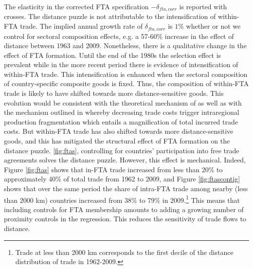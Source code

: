 \documentclass[12pt,twoside,a4paper,notitlepage]{article}
\begin{document}
The elasticity in the corrected FTA specification $-\delta_{fta,corr}$ is reported with crosses.
The distance puzzle is not attributable to the intensification of within-FTA trade.
The implied annual growth rate of $\delta_{fta,corr}$ is $1$\% whether or not we control for sectoral composition effects, e.g.
a 57-60\% increase in the effect of distance between 1963 and 2009.
Nonetheless, there is a qualitative change in the effect of FTA formation.
Until the end of the 1980s the selection effect is prevalent while in the more recent period there is evidence of intensification of within-FTA trade.
This intensification is enhanced when the sectoral composition of country-specific composite goods is fixed.
Thus, the composition of within-FTA trade is likely to have shifted towards more distance-sensitive goods.
This evolution would be consistent with the theoretical mechanism of \cite{Duranton2008} as well as with the mechanism outlined in \cite{Yi2010} whereby decreasing trade costs trigger intraregional production fragmentation which entails a magnification of total incurred trade costs.
But within-FTA trade has also shifted towards more distance-sensitive goods, and this has mitigated the structural effect of FTA formation on the distance puzzle.
\ref{fig:ftas}, controlling for countries' participation into free trade agreements solves the distance puzzle.
However, this effect is mechanical.
Indeed, Figure 
\ref{fig:ftas} shows that in-FTA trade increased from less than 20\% to approximately 40\% of total trade from 1962 to 2009, and Figure 
\ref{fig:ftascontig} shows that over the same period the share of intra-FTA trade among nearby (less than 2000 km) countries increased from 38\% to 79\% in 2009.\footnote{Trade at less than 2000 km corresponds to the first decile of the distance distribution of trade in 1962-2009.} This means that including controls for FTA membership amounts to adding a growing number of proximity controls in the regression.
This reduces the sensitivity of trade flows to distance.
\end{document}
